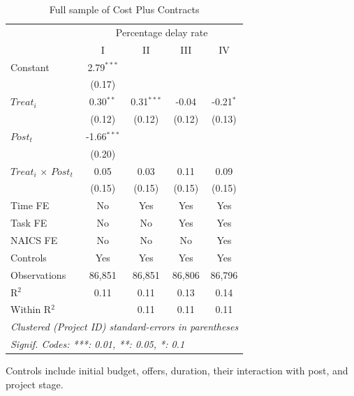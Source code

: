 \documentclass[
]{article}
\begin{document}
\begin{table}[htbp]
   \caption{Full sample of Cost Plus Contracts}
   \centering
   \footnotesize
   \begin{tabular}{lcccc}
      \toprule
       & \multicolumn{4}{c}{Percentage delay rate}\\
                                   & I             & II           & III    & IV\\  
      \midrule 
      Constant                     & 2.79$^{***}$  &              &        &   \\   
                                   & (0.17)        &              &        &   \\   
      $Treat_i$                    & 0.30$^{**}$   & 0.31$^{***}$ & -0.04  & -0.21$^{*}$\\   
                                   & (0.12)        & (0.12)       & (0.12) & (0.13)\\   
      $Post_t$                     & -1.66$^{***}$ &              &        &   \\   
                                   & (0.20)        &              &        &   \\   
      $Treat_i$ $\times$ $Post_t$  & 0.05          & 0.03         & 0.11   & 0.09\\   
                                   & (0.15)        & (0.15)       & (0.15) & (0.15)\\   
      \midrule 
      Time FE                      & No            & Yes          & Yes    & Yes\\  
      Task FE                      & No            & No           & Yes    & Yes\\  
      NAICS FE                     & No            & No           & No     & Yes\\  
      Controls                     & Yes           & Yes          & Yes    & Yes\\  
      Observations                 & 86,851        & 86,851       & 86,806 & 86,796\\  
      R$^2$                        & 0.11          & 0.11         & 0.13   & 0.14\\  
      Within R$^2$                 &               & 0.11         & 0.11   & 0.11\\  
      \midrule
      \multicolumn{5}{l}{\emph{Clustered (Project ID) standard-errors in parentheses}}\\
      \multicolumn{5}{l}{\emph{Signif. Codes: ***: 0.01, **: 0.05, *: 0.1}}\\
   \end{tabular}
   
   \par \raggedright 
   Controls include initial budget, offers, duration, their interaction with post, and project stage. 
\end{table}
\end{document}
